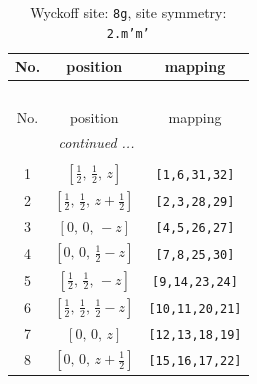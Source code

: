 \documentclass[fleqn,8pt]{jsarticle}
\begin{document}
\begin{longtable}{ccc}
\caption{Wyckoff site: {\tt 8g}, site symmetry: {\tt 2.m'm'}}
 \\
 \hline \hline
No. & position & mapping \\ \hline \endfirsthead

\multicolumn{2}{l}{\tablename\ \thetable{}} \\
 \hline \hline
No. & position & mapping \\ \hline \endhead

 \hline \hline
\multicolumn{2}{r}{\footnotesize\it continued ...} \\ \endfoot

 \hline \hline
\multicolumn{2}{r}{} \\ \endlastfoot

1 & $\left[ \frac{1}{2},\, \frac{1}{2},\, z \right]$ & {\tt [1,6,31,32]} \\ \hline
2 & $\left[ \frac{1}{2},\, \frac{1}{2},\, z + \frac{1}{2} \right]$ & {\tt [2,3,28,29]} \\ \hline
3 & $\left[ 0,\, 0,\, - z \right]$ & {\tt [4,5,26,27]} \\ \hline
4 & $\left[ 0,\, 0,\, \frac{1}{2} - z \right]$ & {\tt [7,8,25,30]} \\ \hline
5 & $\left[ \frac{1}{2},\, \frac{1}{2},\, - z \right]$ & {\tt [9,14,23,24]} \\ \hline
6 & $\left[ \frac{1}{2},\, \frac{1}{2},\, \frac{1}{2} - z \right]$ & {\tt [10,11,20,21]} \\ \hline
7 & $\left[ 0,\, 0,\, z \right]$ & {\tt [12,13,18,19]} \\ \hline
8 & $\left[ 0,\, 0,\, z + \frac{1}{2} \right]$ & {\tt [15,16,17,22]} \\
\end{longtable}
\renewcommand{\arraystretch}{1.2}
\end{document}
